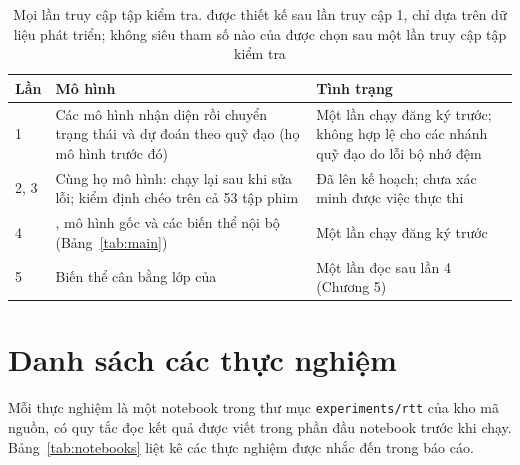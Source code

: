 \begin{table}[!htb]
\centering
\caption{Mọi lần truy cập tập kiểm tra. \model{} được thiết kế sau lần truy cập 1, chỉ dựa trên dữ liệu phát triển; không siêu tham số nào của \model{} được chọn sau một lần truy cập tập kiểm tra}
\label{tab:access}
{\fontsize{12}{14}\selectfont
\begin{tabular}{>{\raggedright}p{1.4cm}>{\raggedright}p{7cm}>{\raggedright\arraybackslash}p{6cm}}
\toprule
Lần & Mô hình & Tình trạng \\
\midrule
1 & Các mô hình nhận diện rồi chuyển trạng thái và dự đoán theo quỹ đạo (họ mô hình trước đó) & Một lần chạy đăng ký trước; không hợp lệ cho các nhánh quỹ đạo do lỗi bộ nhớ đệm \\
2, 3 & Cùng họ mô hình: chạy lại sau khi sửa lỗi; kiểm định chéo trên cả 53 tập phim & Đã lên kế hoạch; chưa xác minh được việc thực thi \\
4 & \model{}, mô hình gốc và các biến thể nội bộ (Bảng~\ref{tab:main}) & Một lần chạy đăng ký trước \\
5 & Biến thể cân bằng lớp của \model{} & Một lần đọc sau lần 4 (Chương 5) \\
\bottomrule
\end{tabular}}
\end{table}

\section{Danh sách các thực nghiệm}

Mỗi thực nghiệm là một notebook trong thư mục \texttt{experiments/rtt} của kho mã nguồn, có quy tắc đọc kết quả được viết trong phần đầu notebook trước khi chạy. Bảng~\ref{tab:notebooks} liệt kê các thực nghiệm được nhắc đến trong báo cáo.

